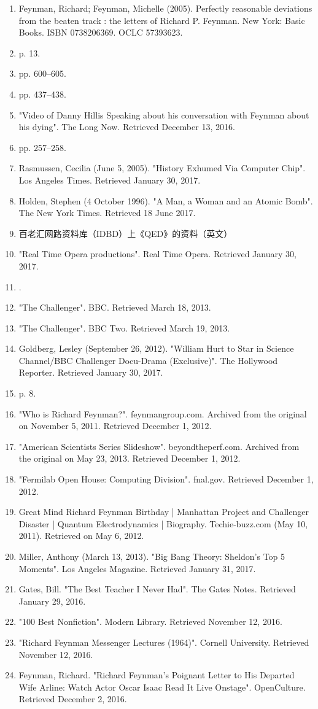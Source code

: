 \begin{enumerate}
\item Feynman, Richard; Feynman, Michelle (2005). Perfectly reasonable deviations from the beaten track : the letters of Richard P. Feynman. New York: Basic Books. ISBN 0738206369. OCLC 57393623.
\item  p. 13.
\item  pp. 600–605.
\item  pp. 437–438.
\item "Video of Danny Hillis Speaking about his conversation with Feynman about his dying". The Long Now. Retrieved December 13, 2016.
\item  pp. 257–258.
\item Rasmussen, Cecilia (June 5, 2005). "History Exhumed Via Computer Chip". Los Angeles Times. Retrieved January 30, 2017.
\item Holden, Stephen (4 October 1996). "A Man, a Woman and an Atomic Bomb". The New York Times. Retrieved 18 June 2017.
\item 百老汇网路资料库（IDBD）上《QED》的资料（英文）
\item "Real Time Opera productions". Real Time Opera. Retrieved January 30, 2017.
\item .
\item "The Challenger". BBC. Retrieved March 18, 2013.
\item "The Challenger". BBC Two. Retrieved March 19, 2013.
\item Goldberg, Lesley (September 26, 2012). "William Hurt to Star in Science Channel/BBC Challenger Docu-Drama (Exclusive)". The Hollywood Reporter. Retrieved January 30, 2017.
\item p. 8.
\item "Who is Richard Feynman?". feynmangroup.com. Archived from the original on November 5, 2011. Retrieved December 1, 2012.
\item "American Scientists Series Slideshow". beyondtheperf.com. Archived from the original on May 23, 2013. Retrieved December 1, 2012.
\item "Fermilab Open House: Computing Division". fnal.gov. Retrieved December 1, 2012.
\item Great Mind Richard Feynman Birthday | Manhattan Project and Challenger Disaster | Quantum Electrodynamics | Biography. Techie-buzz.com (May 10, 2011). Retrieved on May 6, 2012.
\item Miller, Anthony (March 13, 2013). "Big Bang Theory: Sheldon's Top 5 Moments". Los Angeles Magazine. Retrieved January 31, 2017.
\item Gates, Bill. "The Best Teacher I Never Had". The Gates Notes. Retrieved January 29, 2016.
\item "100 Best Nonfiction". Modern Library. Retrieved November 12, 2016.
\item "Richard Feynman Messenger Lectures (1964)". Cornell University. Retrieved November 12, 2016.
\item Feynman, Richard. "Richard Feynman's Poignant Letter to His Departed Wife Arline: Watch Actor Oscar Isaac Read It Live Onstage". OpenCulture. Retrieved December 2, 2016.
\end{enumerate}

